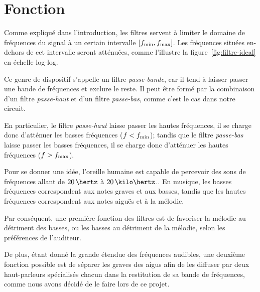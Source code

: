 \section{Fonction}

Comme expliqué dans l'introduction, les filtres servent à limiter
le domaine de fréquences du signal à un certain intervalle
$[f_{\mathrm{min}},f_{\mathrm{max}}]$.
Les fréquences situées en-dehors de cet intervalle seront atténuées,
comme l'illustre la figure~\ref{fig:filtre-ideal} en échelle log-log.

Ce genre de dispositif s'appelle un filtre \emph{passe-bande},
car il tend à laisser passer une bande de fréquences et exclure le reste.
\cite{highpass-def}
Il peut être formé par la combinaison d'un filtre
\emph{passe-haut} et d'un filtre \emph{passe-bas},\cite{high-low-pass-combined}
comme c'est le cas dans notre circuit.

En particulier,
le filtre \emph{passe-haut} laisse passer les hautes fréquences,
il se charge donc d'atténuer les basses fréquences ($f<f_{\mathrm{min}}$);
tandis que le filtre \emph{passe-bas} laisse passer les basses fréquences,
il se charge donc d'atténuer les hautes fréquences ($f>f_{\mathrm{max}}$).

Pour se donner une idée,
l'oreille humaine est capable de percevoir des sons de fréquences
allant de $20\,\hertz$ à $20\,\kilo\hertz$.\cite{hearing-range}.
En musique, les basses fréquences correspondent aux notes graves et aux basses,
tandis que les hautes fréquences correspondent aux notes aiguës et
à la mélodie.

Par conséquent, une première fonction des filtres est de
favoriser la mélodie au détriment des
basses, ou les basses au détriment de la mélodie, selon les préférences
de l'auditeur.

De plus, étant donné la grande étendue des fréquences audibles,
une deuxième fonction possible est de séparer les graves des aigus
afin de les diffuser par deux haut-parleurs spécialisés chacun
dans la restitution de sa bande de fréquences,
comme nous avons décidé de le faire lors de ce projet.
